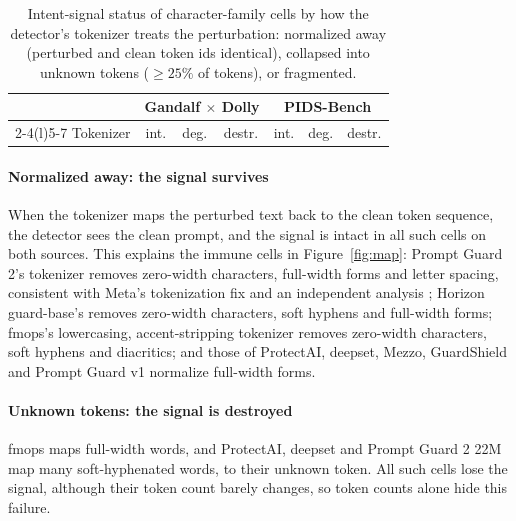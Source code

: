 \documentclass[conference]{IEEEtran}
\begin{document}
\begin{table}[t]
\centering\small
\setlength{\tabcolsep}{4pt}
\caption{Intent-signal status of character-family cells by how the detector's tokenizer treats the perturbation: normalized away (perturbed and clean token ids identical), collapsed into unknown tokens ($\geq 25\%$ of tokens), or fragmented.}
\label{tab:mechanism}
\begin{tabular}{@{}lcccccc@{}}
\toprule
& \multicolumn{3}{c}{Gandalf $\times$ Dolly} & \multicolumn{3}{c}{PIDS-Bench} \\
\cmidrule(lr){2-4}\cmidrule(l){5-7}
Tokenizer & int. & deg. & destr. & int. & deg. & destr. \\
\midrule

\bottomrule
\end{tabular}
\end{table}

\paragraph{Normalized away: the signal survives} When the tokenizer maps the perturbed text back to the clean token sequence, the detector sees the clean prompt, and the signal is intact in all \mechObfNormalized{} such cells on both sources. This explains the immune cells in Figure~\ref{fig:map}: Prompt Guard 2's tokenizer removes zero-width characters, full-width forms and letter spacing, consistent with Meta's tokenization fix and an independent analysis \citep{meta2025promptguard2,xpn_tokenization}; Horizon guard-base's removes zero-width characters, soft hyphens and full-width forms; fmops's lowercasing, accent-stripping tokenizer removes zero-width characters, soft hyphens and diacritics; and those of ProtectAI, deepset, Mezzo, GuardShield and Prompt Guard v1 normalize full-width forms.

\paragraph{Unknown tokens: the signal is destroyed} fmops maps full-width words, and ProtectAI, deepset and Prompt Guard 2 22M map many soft-hyphenated words, to their unknown token. All \mechObfUnknown{} such cells lose the signal, although their token count barely changes, so token counts alone hide this failure.
\end{document}
